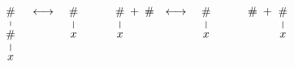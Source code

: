 \documentclass{CSML}
\newcommand{\toto}{\longleftrightarrow}
\begin{document}
\begin{figure}[h!]
\footnotesize
\[\hspace{-8 pt}
\begin{array}{rclcrclcrclrclc}
\begin{minipage}[t]{10mm}
\vspace{-3.5mm}
\hspace{4mm}\begin{tikzpicture}
  [level distance=7mm,
   level 1/.style={sibling distance=10mm},
   level 2/.style={sibling distance=5mm}]
\node {$\#$}
 child { node {$\#$}
         child { node {$x$} }
       };
\end{tikzpicture}
\end{minipage}
&
\vspace{-0mm}\toto
&
\begin{minipage}[t]{5mm}
\vspace{-3.5mm}
\begin{tikzpicture}
  [level distance=7mm,
   level 1/.style={sibling distance=10mm},
   level 2/.style={sibling distance=5mm}]
\node {$\#$}
 child { node {$x$} };
\end{tikzpicture}
\end{minipage}
& ~~ &
\begin{minipage}[t]{5mm}
\vspace{-3.5mm}
\begin{tikzpicture}
  [level distance=7mm,
   level 1/.style={sibling distance=10mm},
   level 2/.style={sibling distance=5mm}]
\node {$\#$}
 child { node {$x$} };
\end{tikzpicture}
\end{minipage}
+ \; \#
&
\vspace{-0mm}\toto
&
\begin{minipage}[t]{5mm}
\vspace{-3.5mm}
\begin{tikzpicture}
  [level distance=7mm,
   level 1/.style={sibling distance=10mm},
   level 2/.style={sibling distance=5mm}]
\node {$\#$}
 child { node {$x$} };
\end{tikzpicture}
\end{minipage}
& \quad &
\# \; + 
\begin{minipage}[t]{5mm}
\vspace{-3.5mm}
\begin{tikzpicture}
  [level distance=7mm,
   level 1/.style={sibling distance=10mm},
   level 2/.style={sibling distance=5mm}]
\node {$\#$}
 child { node {$x$} };
\end{tikzpicture}
\end{minipage}

\end{array}\]
\end{figure}
\end{document}
